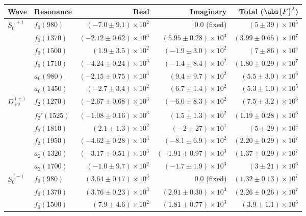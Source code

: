 \begin{table}[h]
    \begin{center}
        \begin{tabular}{llrrr}\toprule
        Wave & Resonance & Real & Imaginary & Total ($\abs{F}^2$) \\\midrule
$S_{0}^{(+)}$ & $f_{0}(980)$ & $(-7.0 \pm 9.1) \times 10^{2}$ & $0.0$ (fixed) & $(5 \pm 39) \times 10^{5}$ \\
 & $f_{0}(1370)$ & $(-2.12 \pm 0.62) \times 10^{3}$ & $(5.95 \pm 0.28) \times 10^{3}$ & $(3.99 \pm 0.65) \times 10^{7}$ \\
 & $f_{0}(1500)$ & $(1.9 \pm 3.5) \times 10^{2}$ & $(-1.9 \pm 3.0) \times 10^{2}$ & $(7 \pm 86) \times 10^{4}$ \\
 & $f_{0}(1710)$ & $(-4.24 \pm 0.24) \times 10^{3}$ & $(-1.4 \pm 8.4) \times 10^{2}$ & $(1.80 \pm 0.29) \times 10^{7}$ \\
 & $a_{0}(980)$ & $(-2.15 \pm 0.75) \times 10^{3}$ & $(9.4 \pm 9.7) \times 10^{2}$ & $(5.5 \pm 3.0) \times 10^{6}$ \\
 & $a_{0}(1450)$ & $(-2.7 \pm 3.4) \times 10^{2}$ & $(6.7 \pm 1.4) \times 10^{2}$ & $(5.3 \pm 1.0) \times 10^{5}$ \\
$D_{+2}^{(+)}$ & $f_{2}(1270)$ & $(-2.67 \pm 0.68) \times 10^{3}$ & $(-6.0 \pm 8.3) \times 10^{2}$ & $(7.5 \pm 3.2) \times 10^{6}$ \\
 & $f_{2}'(1525)$ & $(-1.08 \pm 0.16) \times 10^{3}$ & $(1.5 \pm 1.3) \times 10^{2}$ & $(1.19 \pm 0.28) \times 10^{6}$ \\
 & $f_{2}(1810)$ & $(2.1 \pm 1.3) \times 10^{2}$ & $(-2 \pm 27) \times 10^{1}$ & $(5 \pm 29) \times 10^{4}$ \\
 & $f_{2}(1950)$ & $(-4.62 \pm 0.28) \times 10^{3}$ & $(-8.1 \pm 6.9) \times 10^{2}$ & $(2.20 \pm 0.29) \times 10^{7}$ \\
 & $a_{2}(1320)$ & $(-3.17 \pm 0.51) \times 10^{3}$ & $(-1.91 \pm 0.97) \times 10^{3}$ & $(1.37 \pm 0.29) \times 10^{7}$ \\
 & $a_{2}(1700)$ & $(-1.0 \pm 9.7) \times 10^{2}$ & $(-1.7 \pm 1.9) \times 10^{3}$ & $(3 \pm 21) \times 10^{6}$ \\
$S_{0}^{(-)}$ & $f_{0}(980)$ & $(3.64 \pm 0.17) \times 10^{3}$ & $0.0$ (fixed) & $(1.32 \pm 0.13) \times 10^{7}$ \\
 & $f_{0}(1370)$ & $(3.76 \pm 0.23) \times 10^{3}$ & $(2.91 \pm 0.30) \times 10^{3}$ & $(2.26 \pm 0.26) \times 10^{7}$ \\
 & $f_{0}(1500)$ & $(7.9 \pm 4.6) \times 10^{2}$ & $(1.81 \pm 0.77) \times 10^{3}$ & $(3.9 \pm 1.1) \times 10^{6}$ \\

\end{tabular}
\end{center}
\end{table}
